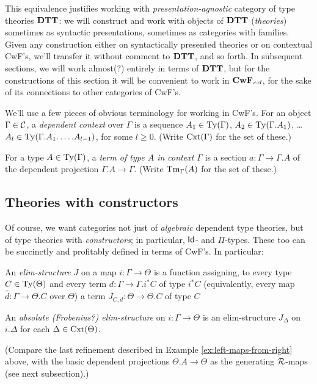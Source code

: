 \documentclass{amsart}
\begin{document}
This equivalence justifies working with \emph{presentation-agnostic} category of type theories $\mathbf{DTT}$: we will construct and work with objects of $\mathbf{DTT}$ (\emph{theories}) sometimes as syntactic presentations, sometimes as categories with families.  Given any construction either on syntactically presented theories or on contextual CwF's, we'll transfer it without comment to $\mathbf{DTT}$, and so forth.  In subsequent sections, we will work almost(?) entirely in terms of $\mathbf{DTT}$, but for the constructions of this section it will be convenient to work in $\mathbf{CwF}_{\mathit{cxl}}$, for the sake of its connections to other categories of CwF's.

\begin{para} We'll use a few pieces of obvious terminology for working in CwF's.  For an object $\Gamma \in \mathcal{C}$, a \emph{dependent context} over $\Gamma$ is a sequence $A_1 \in \mathrm{Ty}(\Gamma)$, $A_2 \in \mathrm{Ty}(\Gamma.A_1)$, \ldots $A_l \in \mathrm{Ty}(\Gamma.A_1.\ldots.A_{l-1})$, for some $l \geq 0$.  (Write $\mathrm{Cxt}(\Gamma)$ for the set of these.)

For a type $A \in \mathrm{Ty}(\Gamma)$, a \emph{term of type $A$ in context $\Gamma$} is a section $a : \Gamma \to \Gamma.A$ of the dependent projection $\Gamma.A \to \Gamma$.  (Write $\mathrm{Tm}_\Gamma(A)$ for the set of these.)
\end{para}

\subsection{Theories with constructors}

Of course, we want categories not just of \emph{algebraic} dependent type theories, but of type theories with \emph{constructors}; in particular, $\mathsf{Id}$- and $\Pi$-types.  These too can be succinctly and profitably defined in terms of CwF's.  In particular:

\begin{definition} An \emph{elim-structure} $J$ on a map $i : \Gamma \to \Theta$ is a function assigning, to every type $C \in \mathrm{Ty}(\Theta)$ and every term $d : \Gamma \to \Gamma.i^*C$ of type $i^*C$ (equivalently, every map $\hat{d} : \Gamma \to \Theta.C$ over $\Theta$) a term $J_{C,d} : \Theta \to \Theta.C$ of type $C$

An \emph{absolute (Frobenius?) elim-structure} on $i : \Gamma \to \Theta$ is an elim-structure $J_\Delta$ on $i.\Delta$ for each $\Delta \in \mathrm{Cxt}(\Theta)$.
\end{definition}

(Compare the last refinement described in Example \ref{ex:left-maps-from-right} above, with the basic dependent projections $\Theta.A \to \Theta$ as the generating $\mathcal{R}$-maps (see next subsection).)
\end{document}
